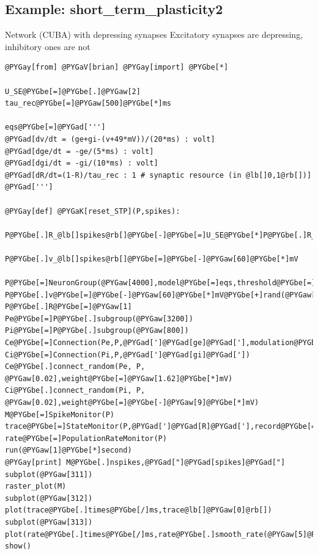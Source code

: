 \documentclass[letterpaper,10pt]{manual}
\begin{document}
\resetcurrentobjects
{}

\hypertarget{index-53}{}\subsection{Example: short\_term\_plasticity2}

Network (CUBA) with depressing synapses
Excitatory synapses are depressing, inhibitory ones are not

\begin{Verbatim}[commandchars=@\[\]]
@PYGay[from] @PYGaV[brian] @PYGay[import] @PYGbe[*]

U_SE@PYGbe[=]@PYGbe[.]@PYGaw[2]
tau_rec@PYGbe[=]@PYGaw[500]@PYGbe[*]ms

eqs@PYGbe[=]@PYGad[''']
@PYGad[dv/dt = (ge+gi-(v+49*mV))/(20*ms) : volt]
@PYGad[dge/dt = -ge/(5*ms) : volt]
@PYGad[dgi/dt = -gi/(10*ms) : volt]
@PYGad[dR/dt=(1-R)/tau_rec : 1 # synaptic resource (in @lb[]0,1@rb[])]
@PYGad[''']

@PYGay[def] @PYGaK[reset_STP](P,spikes):
    P@PYGbe[.]R_@lb[]spikes@rb[]@PYGbe[-]@PYGbe[=]U_SE@PYGbe[*]P@PYGbe[.]R_@lb[]spikes@rb[]
    P@PYGbe[.]v_@lb[]spikes@rb[]@PYGbe[=]@PYGbe[-]@PYGaw[60]@PYGbe[*]mV

P@PYGbe[=]NeuronGroup(@PYGaw[4000],model@PYGbe[=]eqs,threshold@PYGbe[=]@PYGbe[-]@PYGaw[50]@PYGbe[*]mV,reset@PYGbe[=]reset_STP)
P@PYGbe[.]v@PYGbe[=]@PYGbe[-]@PYGaw[60]@PYGbe[*]mV@PYGbe[+]rand(@PYGaw[4000])@PYGbe[*]@PYGaw[10]@PYGbe[*]mV
P@PYGbe[.]R@PYGbe[=]@PYGaw[1]
Pe@PYGbe[=]P@PYGbe[.]subgroup(@PYGaw[3200])
Pi@PYGbe[=]P@PYGbe[.]subgroup(@PYGaw[800])
Ce@PYGbe[=]Connection(Pe,P,@PYGad[']@PYGad[ge]@PYGad['],modulation@PYGbe[=]@PYGad[']@PYGad[R]@PYGad['])
Ci@PYGbe[=]Connection(Pi,P,@PYGad[']@PYGad[gi]@PYGad['])
Ce@PYGbe[.]connect_random(Pe, P, @PYGaw[0.02],weight@PYGbe[=]@PYGaw[1.62]@PYGbe[*]mV)
Ci@PYGbe[.]connect_random(Pi, P, @PYGaw[0.02],weight@PYGbe[=]@PYGbe[-]@PYGaw[9]@PYGbe[*]mV)
M@PYGbe[=]SpikeMonitor(P)
trace@PYGbe[=]StateMonitor(P,@PYGad[']@PYGad[R]@PYGad['],record@PYGbe[=]@PYGaw[0])
rate@PYGbe[=]PopulationRateMonitor(P)
run(@PYGaw[1]@PYGbe[*]second)
@PYGay[print] M@PYGbe[.]nspikes,@PYGad["]@PYGad[spikes]@PYGad["]
subplot(@PYGaw[311])
raster_plot(M)
subplot(@PYGaw[312])
plot(trace@PYGbe[.]times@PYGbe[/]ms,trace@lb[]@PYGaw[0]@rb[])
subplot(@PYGaw[313])
plot(rate@PYGbe[.]times@PYGbe[/]ms,rate@PYGbe[.]smooth_rate(@PYGaw[5]@PYGbe[*]ms))
show()
\end{Verbatim}
\end{document}
